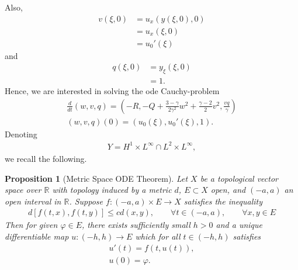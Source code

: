 \documentclass[12pt,reqno]{amsart}
\numberwithin{equation}{section}  %
\numberwithin{figure}{section}
\newcommand{\rr}{\mathbb{R}}
\newcommand{\vp}{\varphi}
\newtheorem{proposition}[theorem]{Proposition}
\begin{document}
Also, 
%
%
\begin{equation*}
\begin{split}
v(\xi, 0)
& = u_{x}(y(\xi, 0), 0)
\\
& = u_{x}(\xi, 0)
\\
& = u_{0}'(\xi)
\end{split}
\end{equation*}
%
%
and
%
%
\begin{equation*}
\begin{split}
q(\xi,0)
& = y_{\xi}(\xi, 0)
\\
& = 1.
\end{split}
\end{equation*}
%
%
Hence, we are interested in solving the ode Cauchy-problem
%
%
%
%
\begin{gather}
\label{ode-system}
\frac{d}{dt}(w, v, q) = \left ( -R, -Q + \frac{3 - \gamma}{2 \gamma^{2}}w^{2} + \frac{\gamma -2}{2}v^{2}, \frac{vq}{\gamma} \right ) 
\\
\label{ode-system-init}
(w, v, q)(0) = (u_{0}(\xi), u_{0}'(\xi), 1).
\end{gather}
%
Denoting
%
%
\begin{equation*}
\begin{split}
  Y = H^{1} \times L^{\infty} \cap L^{2} \times L^{\infty},
\end{split}
\end{equation*}
%
%
we recall the following.
%
\begin{proposition}[Metric Space ODE Theorem]
	\label{prop:ode-thm}
  Let $X$ be a topological vector space over $\rr$
  with topology induced by a metric $d$, $E \subset X$ open, and $(-a, a)$ an
	open interval in $\rr$. Suppose $f: (-a, a) \times E \to X$ satisfies the
	inequality
	\begin{equation}
		\label{stronger-ode}
		\begin{split}
      d[f(t, x), f(t, y)] \le c d(x, y), \qquad \forall t \in (-a, a),
			\qquad \forall x, y \in E
		\end{split}
	\end{equation}
  Then for given $\vp \in E$, there exists sufficiently small $h > 0$ and a
  unique differentiable map $u: (-h, h) \to E$ which for all $t \in (-h, h)$
  satisfies 
	\begin{gather}
    \label{ode-thm-eq}
			u'(t) = f(t, u(t)),
			\\
      \label{ode-thm-init-data}
			u(0) = \vp.
	\end{gather}
\end{proposition}
\end{document}
